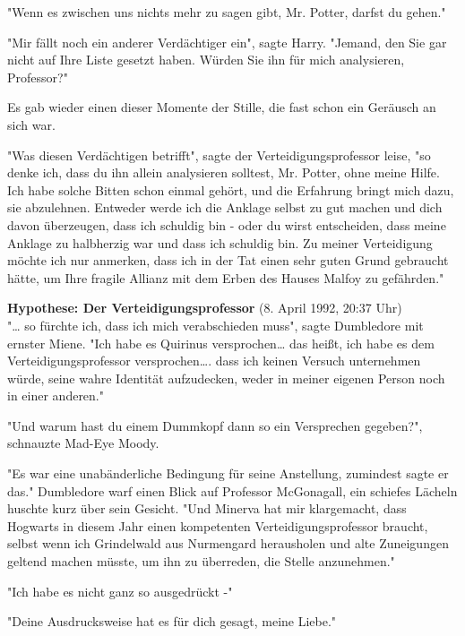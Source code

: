 {"Wenn es zwischen uns nichts mehr zu sagen gibt, Mr. Potter, darfst du gehen."

"Mir fällt noch ein anderer Verdächtiger ein", sagte Harry. "Jemand, den Sie gar nicht auf Ihre Liste gesetzt haben. Würden Sie ihn für mich analysieren, Professor?"

Es gab wieder einen dieser Momente der Stille, die fast schon ein Geräusch an sich war.

"Was diesen Verdächtigen betrifft", sagte der Verteidigungsprofessor leise, "so denke ich, dass du ihn allein analysieren solltest, Mr. Potter, ohne meine Hilfe. Ich habe solche Bitten schon einmal gehört, und die Erfahrung bringt mich dazu, sie abzulehnen. Entweder werde ich die Anklage selbst zu gut machen und dich davon überzeugen, dass ich schuldig bin - oder du wirst entscheiden, dass meine Anklage zu halbherzig war und dass ich schuldig bin. Zu meiner Verteidigung möchte ich nur anmerken, dass ich in der Tat einen sehr guten Grund gebraucht hätte, um Ihre fragile Allianz mit dem Erben des Hauses Malfoy zu gefährden."

\textbf{Hypothese: Der Verteidigungsprofessor} (8. April 1992, 20:37 Uhr)\\ "… so fürchte ich, dass ich mich verabschieden muss", sagte Dumbledore mit ernster Miene. "Ich habe es Quirinus versprochen… das heißt, ich habe es dem Verteidigungsprofessor versprochen…. dass ich keinen Versuch unternehmen würde, seine wahre Identität aufzudecken, weder in meiner eigenen Person noch in einer anderen."

"Und warum hast du einem Dummkopf dann so ein Versprechen gegeben?", schnauzte Mad-Eye Moody.

"Es war eine unabänderliche Bedingung für seine Anstellung, zumindest sagte er das." Dumbledore warf einen Blick auf Professor McGonagall, ein schiefes Lächeln huschte kurz über sein Gesicht. "Und Minerva hat mir klargemacht, dass Hogwarts in diesem Jahr einen kompetenten Verteidigungsprofessor braucht, selbst wenn ich Grindelwald aus Nurmengard herausholen und alte Zuneigungen geltend machen müsste, um ihn zu überreden, die Stelle anzunehmen."

"Ich habe es nicht ganz so ausgedrückt -"

"Deine Ausdrucksweise hat es für dich gesagt, meine Liebe."

}

